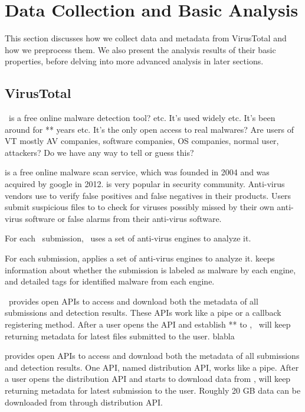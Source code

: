 \section{Data Collection and Basic Analysis}
\label{sec:meth}

This section discusses how we collect data and metadata from VirusTotal
and how we preprocess them.
We also present the analysis results of their basic properties, 
before delving into more advanced analysis in later sections.


\subsection{VirusTotal}
\vt\ is a free online malware detection tool? etc.
It's used widely etc.
It's been around for ** years etc.
It's the only open access to real malwares?
Are users of VT mostly AV companies, software companies, OS companies, normal user, attackers? Do we have any way to tell or guess this?

{\color{red}
\vt is a free online malware scan service, 
which was founded in 2004 and was acquired by google in 2012. 
\vt is very popular in security community. 
Anti-virus vendors use \vt to verify false positives and false negatives in their products.
Users submit suspicious files to \vt to check for viruses possibly missed by their own anti-virus software or false alarms from their anti-virus software.  
}

For each \pe\ submission, \vt\ uses a set of anti-virus engines to analyze it.

{\color{red}
For each submission, \vt applies a set of anti-virus engines to analyze it. 
\vt keeps information about whether the submission is labeled as malware by each engine, 
and detailed tags for identified malware from each engine. 
}

\vt\ provides open APIs to access and download both the metadata of all submissions and detection results.
These APIs work like a pipe or a callback registering method.
After a user opens the API and establish ** to \vt, \vt\ will keep returning metadata for latest files submitted to the user.
blabla

{\color{red}
\vt provides open APIs to access and download both the metadata of all submissions and detection results.
One API, named distribution API, works like a pipe.
After a user opens the distribution API and starts to download data from \vt, 
\vt will keep returning metadata for latest submission to the user. 
Roughly 20 GB data can be downloaded from \vt through distribution API.  
}

